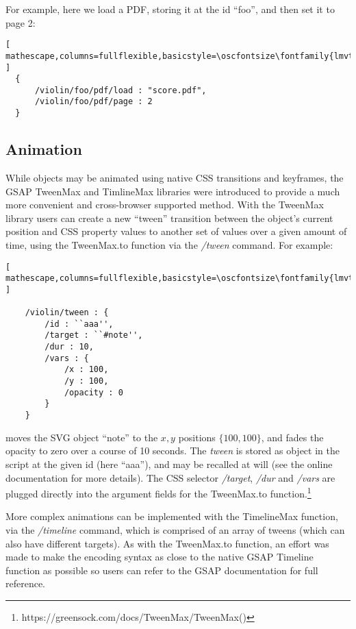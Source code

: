 For example, here we load a PDF, storing it at the \drawsocket id ``foo'', and then set it to page 2:

\begin{lstlisting}[ mathescape,columns=fullflexible,basicstyle=\oscfontsize\fontfamily{lmvtt}\selectfont ]
  {
      /violin/foo/pdf/load : "score.pdf",
      /violin/foo/pdf/page : 2
  }
 \end{lstlisting}


\subsection{Animation}\label{sec:animation}
While \drawsocket objects may be animated using native CSS transitions and keyframes, the GSAP TweenMax and TimlineMax libraries were introduced to provide a much more convenient and cross-browser supported method.
With the TweenMax library users can create a new ``tween'' transition between the object's current position and CSS property values to another set of values over a given amount of time, using the TweenMax.to function via the \textit{/tween} \drawsocket command. For example:
\begin{lstlisting}[ mathescape,columns=fullflexible,basicstyle=\oscfontsize\fontfamily{lmvtt}\selectfont ]

    /violin/tween : {
        /id : ``aaa'',
        /target : ``#note'', 
        /dur : 10,
        /vars : {
            /x : 100,
            /y : 100,
            /opacity : 0
        }
    }
 \end{lstlisting}
\noindent
moves the SVG object ``note'' to the ${x,y}$ positions $\{100,100\}$, and fades the opacity to zero over a course of 10 seconds.
The \textit{tween} is stored as object in the \drawsocket script at the given id (here ``aaa''), and may be recalled at will (see the online documentation for more details).
The CSS selector \textit{/target}, \textit{/dur} and \textit{/vars} are plugged directly into the argument fields for the TweenMax.to function.\footnote{https://greensock.com/docs/TweenMax/TweenMax()}

More complex animations can be implemented with the TimelineMax function, via the \drawsocket \textit{/timeline} command, which is comprised of an array of tweens (which can also have different targets).
As with the TweenMax.to function, an effort was made to make the encoding syntax as close to the native GSAP Timeline function as possible so users can refer to the GSAP documentation for full reference.

